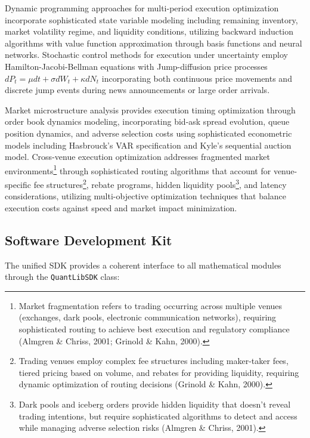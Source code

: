 \documentclass[12pt,a4paper]{article}
\theoremstyle{definition}
\theoremstyle{remark}
\begin{document}
Dynamic programming approaches for multi-period execution optimization incorporate sophisticated state variable modeling including remaining inventory, market volatility regime, and liquidity conditions, utilizing backward induction algorithms with value function approximation through basis functions and neural networks. Stochastic control methods for execution under uncertainty employ Hamilton-Jacobi-Bellman equations with Jump-diffusion price processes $dP_t = \mu dt + \sigma dW_t + \kappa dN_t$ incorporating both continuous price movements and discrete jump events during news announcements or large order arrivals.

Market microstructure analysis provides execution timing optimization through order book dynamics modeling, incorporating bid-ask spread evolution, queue position dynamics, and adverse selection costs using sophisticated econometric models including Hasbrouck's VAR specification and Kyle's sequential auction model. Cross-venue execution optimization addresses fragmented market environments\footnote{Market fragmentation refers to trading occurring across multiple venues (exchanges, dark pools, electronic communication networks), requiring sophisticated routing to achieve best execution and regulatory compliance (Almgren \& Chriss, 2001; Grinold \& Kahn, 2000).} through sophisticated routing algorithms that account for venue-specific fee structures\footnote{Trading venues employ complex fee structures including maker-taker fees, tiered pricing based on volume, and rebates for providing liquidity, requiring dynamic optimization of routing decisions (Grinold \& Kahn, 2000).}, rebate programs, hidden liquidity pools\footnote{Dark pools and iceberg orders provide hidden liquidity that doesn't reveal trading intentions, but require sophisticated algorithms to detect and access while managing adverse selection risks (Almgren \& Chriss, 2001).}, and latency considerations, utilizing multi-objective optimization techniques that balance execution costs against speed and market impact minimization.

\subsection{Software Development Kit}

The unified SDK provides a coherent interface to all mathematical modules through the \texttt{QuantLibSDK} class:
\end{document}
